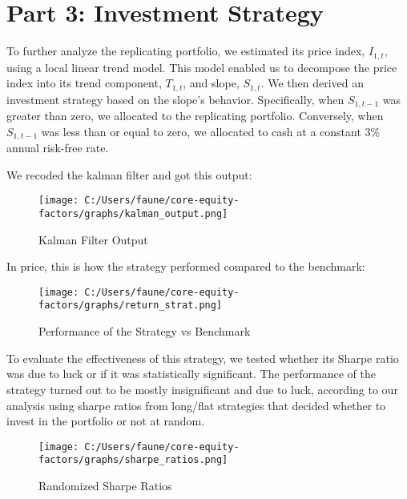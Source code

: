 \documentclass[
  a4paper]{article}
\begin{document}
\newpage

\hypertarget{part-3-investment-strategy}{%
\section{Part 3: Investment Strategy}\label{part-3-investment-strategy}}

To further analyze the replicating portfolio, we estimated its price
index, \(I_{1,t}\), using a local linear trend model. This model enabled
us to decompose the price index into its trend component, \(T_{1,t}\),
and slope, \(S_{1,t}\). We then derived an investment strategy based on
the slope's behavior. Specifically, when \(S_{1,t-1}\) was greater than
zero, we allocated to the replicating portfolio. Conversely, when
\(S_{1,t-1}\) was less than or equal to zero, we allocated to cash at a
constant 3\% annual risk-free rate.

We recoded the kalman filter and got this output:

\begin{figure}

{\centering \texttt{[image: C:/Users/faune/core-equity-factors/graphs/kalman\_output.png]}

}

\caption{Kalman Filter Output}

\end{figure}

In price, this is how the strategy performed compared to the benchmark:

\begin{figure}

{\centering \texttt{[image: C:/Users/faune/core-equity-factors/graphs/return\_strat.png]}

}

\caption{Performance of the Strategy vs Benchmark}

\end{figure}

\newpage

To evaluate the effectiveness of this strategy, we tested whether its
Sharpe ratio was due to luck or if it was statistically significant. The
performance of the strategy turned out to be mostly insignificant and
due to luck, according to our analysis using sharpe ratios from
long/flat strategies that decided whether to invest in the portfolio or
not at random.

\begin{figure}

{\centering \texttt{[image: C:/Users/faune/core-equity-factors/graphs/sharpe\_ratios.png]}

}

\caption{Randomized Sharpe Ratios}

\end{figure}
\end{document}
